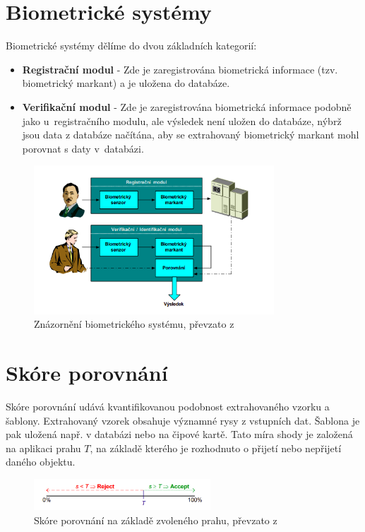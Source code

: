 \section{Biometrické systémy}
Biometrické systémy dělíme do dvou základních kategorií: \cite{Drahansky}
\begin{itemize}
    \item \textbf{Registrační modul} - Zde je zaregistrována biometrická informace (tzv. biometrický markant) a je uložena do databáze.
    \item \textbf{Verifikační modul} - Zde je zaregistrována biometrická informace podobně jako u~registračního modulu, ale výsledek není uložen do databáze, nýbrž jsou data z databáze načítána, aby se extrahovaný biometrický markant mohl porovnat s daty v~databázi. 
\end{itemize}

\begin{figure}[!htbp]
    \centering
    \includegraphics[width=340px]{obrazky-figures/biosystem.png}
    \caption{Znázornění biometrického systému, převzato z \cite{Drahansky}}
\end{figure}

\section{Skóre porovnání}
Skóre porovnání udává kvantifikovanou podobnost extrahovaného vzorku a šablony. Extrahovaný vzorek obsahuje významné rysy z vstupních dat. Šablona je pak uložená např. v databázi nebo na čipové kartě. Tato míra shody je založená na aplikaci prahu $T$, na základě kterého je rozhodnuto o přijetí nebo nepřijetí daného objektu. \cite{Drahansky}

\begin{figure}[!htbp]
    \centering
    \includegraphics[width=250px]{obrazky-figures/mira.png}
    \caption{Skóre porovnání na základě zvoleného prahu, převzato z \cite{Drahansky}}
\end{figure}

